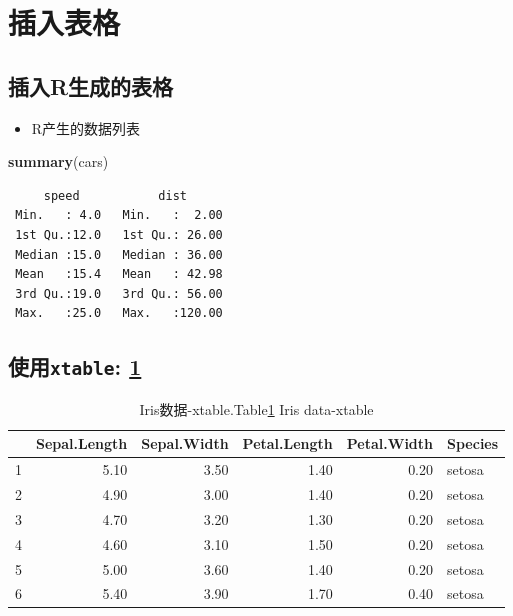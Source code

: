 \documentclass[12pt,a4paper,zihao=-4,UTF8]{book}
\newenvironment{Shaded}{\begin{snugshade}}{\end{snugshade}}
\newcommand{\KeywordTok}[1]{\textcolor[rgb]{0.13,0.29,0.53}{\textbf{#1}}}
\newcommand{\NormalTok}[1]{#1}
\providecommand{\tightlist}{%
  \setlength{\itemsep}{0pt}\setlength{\parskip}{0pt}}
\begin{document}
\section{插入表格}

\subsection{插入R生成的表格}\label{r}

\begin{itemize}
\tightlist
\item
  R产生的数据列表
\end{itemize}

\begin{Shaded}
\begin{Highlighting}[]
\KeywordTok{summary}\NormalTok{(cars)}
\end{Highlighting}
\end{Shaded}

\begin{verbatim}
     speed           dist       
 Min.   : 4.0   Min.   :  2.00  
 1st Qu.:12.0   1st Qu.: 26.00  
 Median :15.0   Median : 36.00  
 Mean   :15.4   Mean   : 42.98  
 3rd Qu.:19.0   3rd Qu.: 56.00  
 Max.   :25.0   Max.   :120.00  
\end{verbatim}

\subsection{\texorpdfstring{使用\texttt{xtable}:
\cref{tab:xtable}}{使用xtable: }}\label{xtable}

\begin{table}[ht]
\centering
\caption{\label{tab:xtable}Iris数据-xtable.\protect\linebreak Table\ref{tab:xtable}   Iris data-xtable} 
\begin{tabular}{rrrrrl}
  \hline
 & Sepal.Length & Sepal.Width & Petal.Length & Petal.Width & Species \\ 
  \hline
1 & 5.10 & 3.50 & 1.40 & 0.20 & setosa \\ 
  2 & 4.90 & 3.00 & 1.40 & 0.20 & setosa \\ 
  3 & 4.70 & 3.20 & 1.30 & 0.20 & setosa \\ 
  4 & 4.60 & 3.10 & 1.50 & 0.20 & setosa \\ 
  5 & 5.00 & 3.60 & 1.40 & 0.20 & setosa \\ 
  6 & 5.40 & 3.90 & 1.70 & 0.40 & setosa \\ 
   \hline
\end{tabular}
\end{table}
\end{document}
